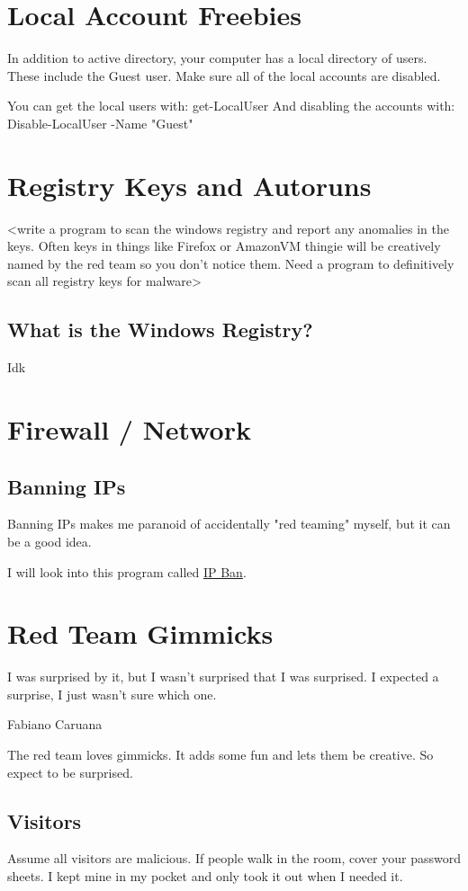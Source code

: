 \documentclass{article}
\begin{document}
\section{Local Account Freebies}
In addition to active directory, your computer has a local directory of users. These include the Guest user.
Make sure all of the local accounts are disabled.

You can get the local users with: get-LocalUser
And disabling the accounts with: Disable-LocalUser -Name "Guest"

\section{Registry Keys and Autoruns}
<write a program to scan the windows registry and report any anomalies in the keys.
Often keys in things like Firefox or AmazonVM thingie will be creatively named by the red team
so you don't notice them. Need a program to definitively scan all registry keys for malware>

\subsection{What is the Windows Registry?}
Idk

\section{Firewall / Network}

\subsection{Banning IPs}
Banning IPs makes me paranoid of accidentally "red teaming" myself, but it can be a good idea.

I will look into this program called \href{https://github.com/DigitalRuby/IPBan}{IP Ban}.

\section{Red Team Gimmicks}
\epigraph{I was surprised by it, but I wasn’t surprised that I was surprised. I expected a surprise, I just wasn’t sure which one.}
{Fabiano Caruana}

The red team loves gimmicks. It adds some fun and lets them be creative. So expect to be surprised.

\subsection{Visitors}
Assume all visitors are malicious.
If people walk in the room, cover your password sheets. I kept mine in my pocket and only took it out when I needed it. 
\end{document}
